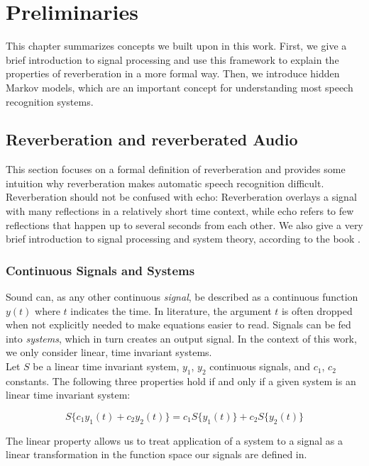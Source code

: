 \chapter{Preliminaries}
\label{ch:preleminaries}

This chapter summarizes concepts we built upon in this work. First, we give a brief introduction to signal processing and use this framework to explain the properties of reverberation in a more formal way. Then, we introduce hidden Markov models, which are an important concept for understanding most speech recognition systems. 

\section{Reverberation and reverberated Audio}
\label{sec:reverberation}

This section focuses on a formal definition of reverberation and provides some intuition why reverberation makes automatic speech recognition difficult. Reverberation should not be confused with echo: Reverberation overlays a signal with many reflections in a relatively short time context, while echo refers to few reflections that happen up to several seconds from each other. We also give a very brief introduction to signal processing and system theory, according to the book \cite{leon2015signale}.

\subsection{Continuous Signals and Systems}

Sound can, as any other continuous \textit{signal}, be described as a continuous function $y(t)$ where $t$ indicates the time. In literature, the argument $t$ is often dropped  when not explicitly needed to make equations easier to read.  
Signals can be fed into \textit{systems}, which in turn creates an output signal. In the context of this work, we only consider linear, time invariant systems. 
\\
Let $S$ be a linear time invariant system, $y_1$, $y_2$ continuous signals, and $c_1$, $c_2$ constants. The following three properties hold if and only if a given system is an linear time invariant system: 

\[S\{c_1 y_1(t) + c_2 y_2(t)\} = c_1 S\{y_1(t)\} + c_2 S\{y_2(t)\} \tag{linearity}\]

The linear property allows us to treat application of a system to a signal as a linear transformation in the function space our signals are defined in. 

